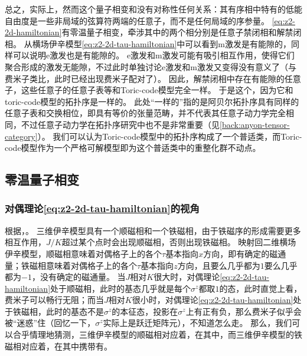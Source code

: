 总之，实际上，然而这个量子相变和没有对称性任何关系：其有序相中特有的低能自由度是一些非局域的弦算符两端的任意子，而不是任何局域的序参量。
\eqref{eq:z2-2d-hamiltonian}有零温量子相变，牵涉其中的两个相分别是任意子禁闭相和解禁闭相。
从横场伊辛模型\eqref{eq:z2-2d-tau-hamiltonian}中可以看到m激发是有能隙的，同样可以说明e激发也是有能隙的。
e激发和m激发可能有吸引相互作用，使得它们聚合形成的激发无能隙，不过此时单独讨论e激发和m激发又变得没有意义了（与费米子类比，此时已经出现费米子配对了）。
因此，解禁闭相中存在有能隙的任意子，这些任意子的任意子表等和Toric-code模型完全一样。
于是这个，因为它和toric-code模型的拓扑序是一样的。
此处“一样的”指的是阿贝尔拓扑序具有同样的任意子表和交换相位，即具有等价的张量范畴，并不代表其任意子动力学完全相同，不过任意子动力学在拓扑序研究中也不是非常重要（见\autoref{back:anyon-tensor-category}）。
我们可以认为Toric-code模型中的拓扑序构成了一个普适类，而Toric-code模型作为一个严格可解模型即为这个普适类中的重整化群不动点。


\subsection{零温量子相变}\label{sec:z2-quantum-phase-transition}

\subsubsection{对偶理论\eqref{eq:z2-2d-tau-hamiltonian}的视角}

根据，。
三维伊辛模型具有一个顺磁相和一个铁磁相，由于铁磁序的形成需要更多相互作用，$J/K$超过某个点时会出现顺磁相，否则出现铁磁相。
映射回二维横场伊辛模型，顺磁相意味着对偶格子上的各个$\tau$基本指向$x$方向，即有确定的磁通量；铁磁相意味着对偶格子上的各个$\tau$基本指向$z$方向，且要么几乎都为$1$要么几乎都为$-1$，没有确定的磁通量。
当$J$相对$K$很大时，对偶理论\eqref{eq:z2-2d-tau-hamiltonian}处于顺磁相，此时的基态几乎就是每个$\sigma^z$都取$1$的态，此时直觉上看，费米子可以畅行无阻；而当$J$相对$K$很小时，对偶理论\eqref{eq:z2-2d-tau-hamiltonian}处于铁磁相，此时的基态不是$\sigma^z$的本征态，投影在$\sigma^z$上有正有负，那么费米子似乎会被“迷惑”住（回忆一下，$\sigma^z$实际上是跃迁矩阵元），不知道怎么走。
那么，我们可以合乎情理地猜测，三维伊辛模型的顺磁相对应着，在其中，而三维伊辛模型的铁磁相对应着，在其中携带有。

